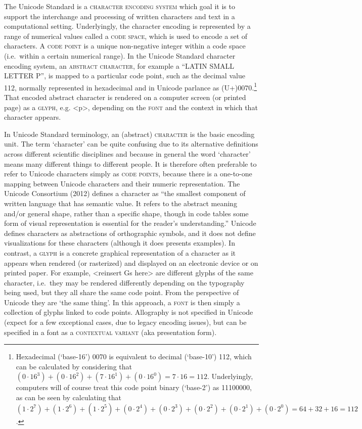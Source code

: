 The Unicode Standard is a \textsc{character encoding system} which goal it is to support the interchange and processing of written characters and text in a computational setting. Underlyingly, the character encoding is represented by a range of numerical values called a \textsc{code space}, which is used to encode a set of characters. A \textsc{code point} is a unique non-negative integer within a code space (i.e.~within a certain numerical range). In the Unicode Standard character encoding system, an \textsc{abstract character}, for example a ``LATIN SMALL LETTER P'', is mapped to a particular code point, such as the decimal value 112, normally represented in hexadecimal and in Unicode parlance as (U+)0070.\footnote{Hexadecimal (`base-16') 0070 is equivalent to decimal (`base-10') 112, which can be calculated by considering that $(0\cdot16^3) + (0\cdot16^2) + (7\cdot16^1) + (0\cdot16^0) = 7\cdot16 = 112$. Underlyingly, computers will of course treat this code point binary (`base-2') as 11100000, as can be seen by calculating that $(1\cdot2^7) + (1\cdot2^6) + (1\cdot2^5) + (0\cdot2^4) + (0\cdot2^3) + (0\cdot2^2) + (0\cdot2^1) + (0\cdot2^0) = 64 + 32 + 16 = 112$.} That encoded abstract character is rendered on a computer screen (or printed page) as a \textsc{glyph}, e.g. <p>, depending on the \textsc{font} and the context in which that character appears.

In Unicode Standard terminology, an (abstract) \textsc{character} is the basic encoding unit. The term `character' can be quite confusing due to its alternative definitions across different scientific disciplines and because in general the word `character' means many different things to different people. It is therefore often preferable to refer to Unicode characters simply as \textsc{code points}, because there is a one-to-one mapping between Unicode characters and their numeric representation. The Unicode Consortium (2012) defines a character as ``the smallest component of written language that has semantic value. It refers to the abstract meaning and/or general shape, rather than a specific shape, though in code tables some form of visual representation is essential for the reader's understanding.'' Unicode defines characters as abstractions of orthographic symbols, and it does not define visualizations for these characters (although it does presents examples). In contrast, a \textsc{glyph} is a concrete graphical representation of a character as it appears when rendered (or rasterized) and displayed on an electronic device or on printed paper. For example, <reinsert Gs here> are different glyphs of the same character, i.e.~they may be rendered differently depending on the typography being used, but they all share the same code point. From the perspective of Unicode they are `the same thing'. In this approach, a \textsc{font} is then simply a collection of glyphs linked to code points. Allography is not specified in Unicode (expect for a few exceptional cases, due to legacy encoding issues), but can be specified in a font as a \textsc{contextual variant} (aka presentation form).

